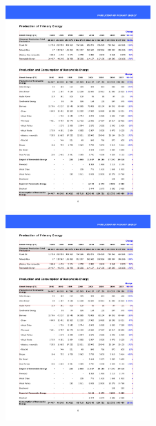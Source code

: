 \begin{figure}[t]
\centering

\includegraphics[width=15em]{img/results/tableFind1Tess.jpg}
\includegraphics[width=15em]{img/results/tableFind1Us.png}

\caption{}
\label{fig:tableFindComparison_Tess}
\end{figure}

